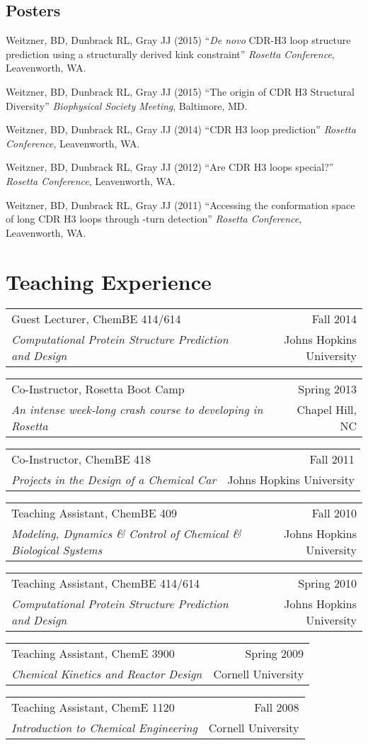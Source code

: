 \documentclass[12pt]{article}
\makeatletter
\newcommand{\allcapsspacing}[1]{{\addfontfeature{LetterSpace=7.5}#1}}
\newcommand{\tworowstwocolsitem}[4]{
\noindent
\begin{tabular*}{\textwidth}{@{\extracolsep{\fill}}lr}
		#1 & #2 \\
		#3 & #4 \\
\end{tabular*}\vspace{0.75\baselineskip}}
\newcommand{\teachingitem}[4]{
\tworowstwocolsitem{#1}{#2}{\textit{#3}}{#4}}
\makeatother
\begin{document}
\subsection*{\allcapsspacing{Posters}}
\begin{etaremune}
\item Weitzner, BD, Dunbrack RL, Gray JJ (2015) ``\textit{De novo} CDR-H3 loop structure prediction using a structurally derived kink constraint'' \textit{Rosetta Conference}, Leavenworth, WA.
\item Weitzner, BD, Dunbrack RL, Gray JJ (2015) ``The origin of CDR H3 Structural Diversity'' \textit{Biophysical Society Meeting}, Baltimore, MD.
\item Weitzner, BD, Dunbrack RL, Gray JJ (2014) ``CDR H3 loop prediction'' \textit{Rosetta Conference}, Leavenworth, WA.
\item Weitzner, BD, Dunbrack RL, Gray JJ (2012) ``Are CDR H3 loops special?'' \textit{Rosetta Conference}, Leavenworth, WA.
\item Weitzner, BD, Dunbrack RL, Gray JJ (2011) ``Accessing the conformation space of long CDR H3 loops through \textbeta-turn detection'' \textit{Rosetta Conference}, Leavenworth, WA.
\end{etaremune}

\section*{\allcapsspacing{Teaching Experience}}
\teachingitem{Guest Lecturer, ChemBE 414/614}{Fall 2014}{Computational Protein Structure Prediction and Design}{Johns Hopkins University}
\teachingitem{Co-Instructor, Rosetta Boot Camp}{Spring 2013}{An intense week-long crash course to developing in Rosetta}{Chapel Hill, NC}
\teachingitem{Co-Instructor, ChemBE 418}{Fall 2011}{Projects in the Design of a Chemical Car}{Johns Hopkins University}
\teachingitem{Teaching Assistant, ChemBE 409}{Fall 2010}{Modeling, Dynamics \& Control of Chemical \& Biological Systems}{Johns Hopkins University}
\teachingitem{Teaching Assistant, ChemBE 414/614}{Spring 2010}{Computational Protein Structure Prediction and Design}{Johns Hopkins University}
\teachingitem{Teaching Assistant, ChemE 3900}{Spring 2009}{Chemical Kinetics and Reactor Design}{Cornell University}
\teachingitem{Teaching Assistant, ChemE 1120}{Fall 2008}{Introduction to Chemical Engineering}{Cornell University}
\end{document}
